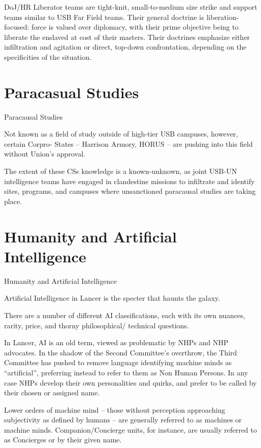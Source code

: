 DoJ/HR Liberator teams are tight-knit, small-to-medium size strike and support teams similar to  
USB Far Field teams. Their general doctrine is liberation-focused: force is valued over diplomacy,  
with their prime objective being to liberate the enslaved at cost of their masters. Their doctrines  
emphasize either infiltration and agitation or direct, top-down confrontation, depending on the  
specificities of the situation. 
 
\section{Paracasual Studies}
Paracausal Studies  

Not known as a field of study outside of high-tier USB campuses, however, certain Corpro- 
States -- Harrison Armory, HORUS -- are pushing into this field without Union’s approval. 
 

                                                                                                          


The extent of these CSs knowledge is a known-unknown, as joint USB-UN intelligence teams  
have engaged in clandestine missions to infiltrate and identify sites, programs, and campuses  
where unsanctioned paracausal studies are taking place.    

\section{Humanity and Artificial Intelligence}

Humanity and Artificial Intelligence  

Artificial Intelligence in Lancer is the specter that haunts the galaxy. 
 

There are a number of different AI classifications, each with its own nuances, rarity, price, and  
thorny philosophical/ technical questions. 
 

In Lancer, AI is an old term, viewed as problematic by NHPs and NHP advocates. In the shadow  
of the Second Committee’s overthrow, the Third Committee has pushed to remove language  
identifying machine minds as “artificial”, preferring instead to refer to them as Non Human  
Persons. In any case NHPs develop their own personalities and quirks, and prefer to be called by  
their chosen or assigned name. 
 

Lower orders of machine mind -- those without perception approaching subjectivity as defined  
by humans -- are generally referred to as machines or machine minds. Companion/Concierge  
units, for instance, are usually referred to as Concierges or by their given name. 
 

